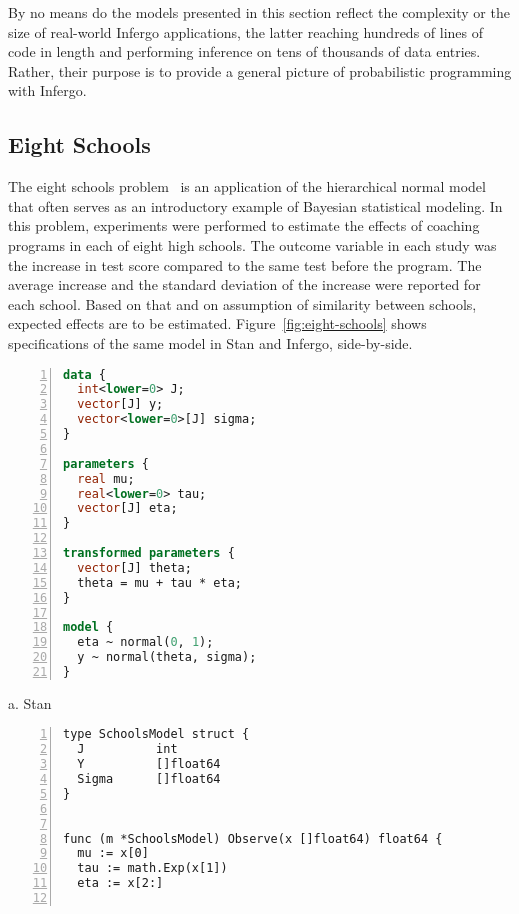 \documentclass[sigplan,10pt,screen]{acmart}
\begin{document}
\begin{sloppypar}
By no means do the models presented in this section reflect the
complexity or the size of real-world Infergo applications, the
latter reaching hundreds of lines of code in length and
performing inference on tens of thousands of data entries.
Rather, their purpose is to provide a general picture of
probabilistic programming with Infergo.

\subsection{Eight Schools}
\label{sec:eight-schools}

The eight schools problem~\cite{GCS+03} is an application of
the hierarchical normal model that often serves as an introductory
example of Bayesian statistical modeling.  In this problem,
experiments were performed to estimate the effects of coaching
programs in each of eight high schools. The outcome variable in
each study was the increase in test score compared to the same
test before the program. The average increase and the standard
deviation of the increase were reported for each school. Based
on that and on assumption of similarity between schools,
expected effects are to be estimated.
Figure~\ref{fig:eight-schools} shows specifications of the same
model in Stan and Infergo, side-by-side.
\begin{figure*}
\begin{minipage}[t]{0.45\textwidth}
  \begin{lstlisting}[language=Stan,framexleftmargin=10pt,numbers=left]
data {
  int<lower=0> J;
  vector[J] y;
  vector<lower=0>[J] sigma;
}

parameters {
  real mu;
  real<lower=0> tau;
  vector[J] eta;
}

transformed parameters {
  vector[J] theta;
  theta = mu + tau * eta;
}

model {
  eta ~ normal(0, 1);
  y ~ normal(theta, sigma);
}
\end{lstlisting}

\centering
a. Stan
  \end{minipage}
  \hfill
\begin{minipage}[t]{0.5\textwidth}
\begin{lstlisting}[framexleftmargin=10pt,numbers=left]
type SchoolsModel struct {
  J          int
  Y          []float64
  Sigma      []float64
}


func (m *SchoolsModel) Observe(x []float64) float64 {
  mu := x[0]
  tau := math.Exp(x[1])
  eta := x[2:]


\end{lstlisting}
\end{minipage}
\end{figure*}
\end{sloppypar}
\end{document}
